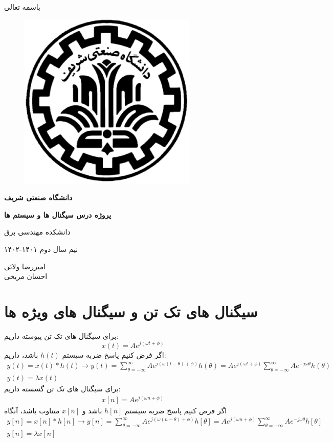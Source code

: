 \documentclass[fleqn]{article}
\theoremstyle{definition}
\begin{document}
\begin{titlepage}
    \centering
    \huge
    باسمه تعالی
    \\
    \vspace{0.5 cm}
    \begin{figure}[h!]
        \includegraphics[width=4 cm]{logo.png}
        \centering
    \end{figure}
    \huge
    \textbf{دانشگاه صنعتی شریف}
    \vspace{1.5 cm}
    \Huge

    \textbf{پروژه درس سیگنال ها و سیستم ها}
    \huge

    \vspace{1.2 cm}
    دانشکده مهندسی برق

    \vspace{0.5 cm}
    نیم سال دوم ۱۴۰۱-۱۴۰۲

    \vspace{1.5 cm}
    امیررضا ولائی \\
    احسان مریخی 

\end{titlepage}
\large
\noindent

\section{سیگنال های تک تن و سیگنال های ویژه ها}

برای سیگنال های تک تن پیوسته داریم:
$$x(t)=Ae^{j(\omega t + \phi)}$$
اگر فرض کنیم پاسخ ضربه سیستم $h(t)$ باشد، داریم:
\begin{gather*}
    y(t)=x(t)*h(t)\rightarrow y(t)=\sum_{\theta=-\infty}^{\infty}Ae^{j(\omega(t-\theta) + \phi)}h(\theta)=Ae^{j(\omega t + \phi)}\sum_{\theta=-\infty}^{\infty}Ae^{-j\omega \theta}h(\theta) \\
    y(t)=\lambda x(t)
\end{gather*}
برای سیگنال های تک تن گسسته داریم:
\begin{gather*}
    x[n]=Ae^{j(\omega n + \phi)}
\end{gather*}
اگر فرض کنیم پاسخ ضربه سیستم $h[n]$ باشد و $x[n]$ متناوب باشد، آنگاه
\begin{gather*}
    y[n]=x[n]*h[n]\rightarrow y[n]=\sum_{\theta=-\infty}^{\infty}Ae^{j(\omega(n-\theta) + \phi)}h[\theta]=Ae^{j(\omega n + \phi)}\sum_{\theta=-\infty}^{\infty}Ae^{-j\omega \theta}h[\theta] \\
    y[n]=\lambda x[n]
\end{gather*}
\end{document}

